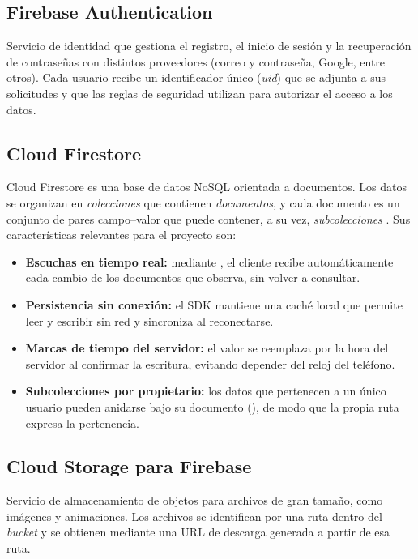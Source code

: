 \subsection{Firebase Authentication}

Servicio de identidad que gestiona el registro, el inicio de sesión y la
recuperación de contraseñas con distintos proveedores (correo y contraseña,
Google, entre otros). Cada usuario recibe un identificador único (\emph{uid})
que se adjunta a sus solicitudes y que las reglas de seguridad utilizan para
autorizar el acceso a los datos.

\subsection{Cloud Firestore}

Cloud Firestore es una base de datos NoSQL orientada a documentos. Los datos se
organizan en \emph{colecciones} que contienen \emph{documentos}, y cada
documento es un conjunto de pares campo--valor que puede contener, a su vez,
\emph{subcolecciones} \citep{firestore}. Sus características relevantes para
el proyecto son:

\begin{itemize}
    \item \textbf{Escuchas en tiempo real:} mediante , el
    cliente recibe automáticamente cada cambio de los documentos que observa,
    sin volver a consultar.
    \item \textbf{Persistencia sin conexión:} el SDK mantiene una caché local
    que permite leer y escribir sin red y sincroniza al reconectarse.
    \item \textbf{Marcas de tiempo del servidor:} el valor
     se reemplaza por la hora del servidor al
    confirmar la escritura, evitando depender del reloj del teléfono.
    \item \textbf{Subcolecciones por propietario:} los datos que pertenecen a
    un único usuario pueden anidarse bajo su documento
    (), de modo que la propia ruta expresa la
    pertenencia.
\end{itemize}

\subsection{Cloud Storage para Firebase}

Servicio de almacenamiento de objetos para archivos de gran tamaño, como
imágenes y animaciones. Los archivos se identifican por una ruta dentro del
\emph{bucket} y se obtienen mediante una URL de descarga generada a partir de
esa ruta.

